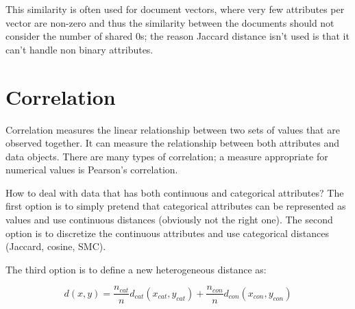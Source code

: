 This similarity is often used for document vectors, where very few attributes per vector are non-zero and thus the similarity between the documents should not consider the number of shared 0s; the reason Jaccard distance isn't used is that it can't handle non binary attributes.

\section{Correlation}

Correlation measures the linear relationship between two sets of values that are observed together. It can measure the relationship between both attributes and data objects. There are many types of correlation; a measure appropriate for numerical values is Pearson's correlation.

How to deal with data that has both continuous and categorical attributes? The first option is to simply pretend that categorical attributes can be represented as values and use continuous distances (obviously not the right one). The second option is to discretize the continuous attributes and use categorical distances (Jaccard, cosine, SMC).

The third option is to define a new heterogeneous distance as:

\begin{equation*}
    d(x,y) = \frac{n_{cat}}{n} d_{cat}(x_{cat}, y_{cat}) + \frac{n_{con}}{n} d_{con}(x_{con},y_{con})
\end{equation*}